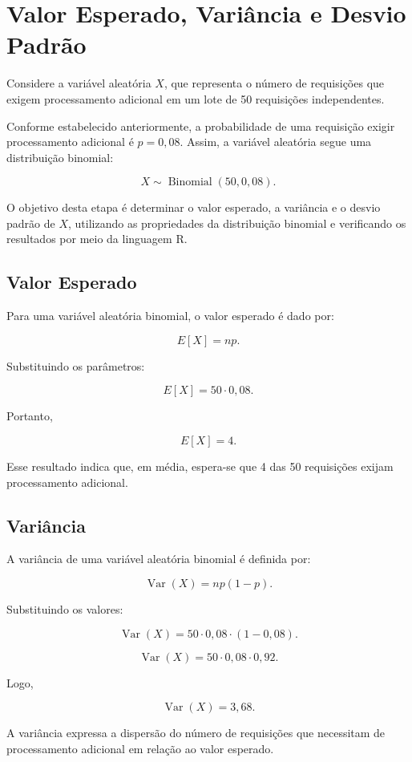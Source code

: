 \documentclass[12pt,a4paper]{article}
\begin{document}
\section{Valor Esperado, Variância e Desvio Padrão}

Considere a variável aleatória $X$, que representa o número de requisições que exigem processamento adicional em um lote de 50 requisições independentes.

Conforme estabelecido anteriormente, a probabilidade de uma requisição exigir processamento adicional é $p=0{,}08$. Assim, a variável aleatória segue uma distribuição binomial:

\[
X \sim \operatorname{Binomial}(50,0{,}08).
\]

O objetivo desta etapa é determinar o valor esperado, a variância e o desvio padrão de $X$, utilizando as propriedades da distribuição binomial e verificando os resultados por meio da linguagem R.

\subsection{Valor Esperado}

Para uma variável aleatória binomial, o valor esperado é dado por:

\[
E[X]=np.
\]

Substituindo os parâmetros:

\[
E[X]=50 \cdot 0{,}08.
\]

Portanto,

\[
\boxed{E[X]=4}.
\]

Esse resultado indica que, em média, espera-se que 4 das 50 requisições exijam processamento adicional.

\subsection{Variância}

A variância de uma variável aleatória binomial é definida por:

\[
\operatorname{Var}(X)=np(1-p).
\]

Substituindo os valores:

\[
\operatorname{Var}(X)
=50 \cdot 0{,}08 \cdot (1-0{,}08).
\]

\[
\operatorname{Var}(X)
=50 \cdot 0{,}08 \cdot 0{,}92.
\]

Logo,

\[
\boxed{\operatorname{Var}(X)=3{,}68}.
\]

A variância expressa a dispersão do número de requisições que necessitam de processamento adicional em relação ao valor esperado.
\end{document}
